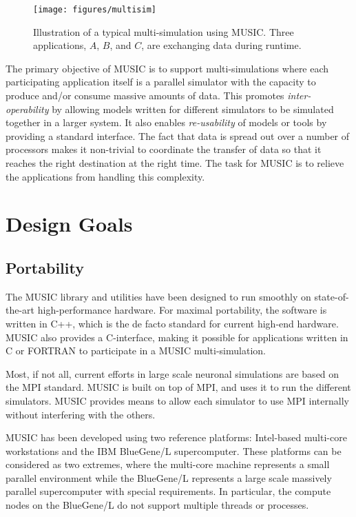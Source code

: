 \documentclass[a4paper,twoside]{report}
\begin{document}
\begin{figure}
  \begin{center}
    \texttt{[image: figures/multisim]}
    \caption[Typical multi-simulation]{\label{fig:multisim}
      Illustration of a typical multi-simulation using MUSIC.  Three
      applications, $A$, $B$, and $C$, are exchanging data during
      runtime.
    }
  \end{center}
\end{figure}

The primary objective of MUSIC is to support multi-simulations where
each participating application itself is a parallel simulator with the
capacity to produce and/or consume massive amounts of data.  This
promotes \emph{inter-operability} by allowing models written for
different simulators to be simulated together in a larger system.  It
also enables \emph{re-usability} of models or tools by providing a
standard interface.  The fact that data is spread out over a number of
processors makes it non-trivial to coordinate the transfer of data so
that it reaches the right destination at the right time.  The task for
MUSIC is to relieve the applications from handling this complexity.


\section{Design Goals}

\subsection{Portability}

The MUSIC library and utilities have been designed to run
smoothly on state-of-the-art high-performance hardware.  For maximal
portability, the software is written in C++, which is the de facto
standard for current high-end hardware.  MUSIC also provides a
C-interface, making it possible for applications written in C or
FORTRAN to participate in a MUSIC multi-simulation.

Most, if not all, current efforts in large scale neuronal simulations
are based on the MPI standard.  MUSIC is built on top of
MPI, and uses it to run the different simulators.  MUSIC provides
means to allow each simulator to use MPI internally without
interfering with the others.

MUSIC has been developed using two reference platforms: Intel-based
multi-core workstations and the IBM
BlueGene/L supercomputer.  These
platforms can be considered as two extremes, where the multi-core
machine represents a small parallel environment while the BlueGene/L
represents a large scale massively parallel supercomputer with special
requirements.  In particular, the compute nodes on the BlueGene/L do
not support multiple threads or processes.
\end{document}
